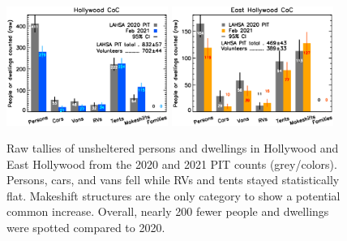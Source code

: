 \documentclass[11pt]{article}
\def\resp{respectively}
\begin{document}
\begin{figure}[h]
	\centering
	\includegraphics[width = 0.47\textwidth, trim = 1cm 0cm 0cm 0cm]{Hwood2021Bars}
	\includegraphics[width = 0.47\textwidth, trim = 0cm 0cm 1cm 0cm]{Eho2021Bars}
	\caption{Raw tallies of unsheltered persons and dwellings in Hollywood and East Hollywood
			from the 2020 and 2021 PIT counts (grey/colors). Persons, cars, 
			and vans fell while RVs and tents stayed statistically flat. Makeshift structures 
			are the only category to show a potential common increase. 
			Overall, nearly 200 fewer people and dwellings were spotted compared to 2020.}
	\label{fig:rawCounts}
\end{figure}


\end{document}
